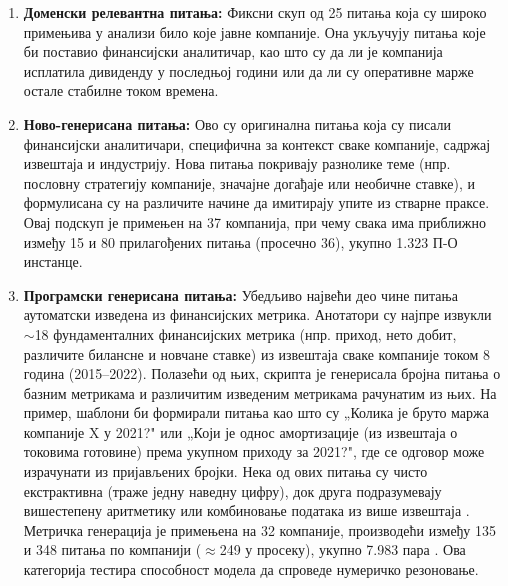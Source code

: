 \begin{enumerate}
\item \textbf{Доменски релевантна питања:} Фиксни скуп од 25 питања која су широко примењива у анализи било које јавне компаније. Она укључују питања које би поставио финансијски аналитичар, као што су да ли је компанија исплатила дивиденду у последњој години или да ли су оперативне марже остале стабилне током времена.

\item \textbf{Ново-генерисана питања:} Ово су оригинална питања која су писали финансијски аналитичари, специфична за контекст сваке компаније, садржај извештаја и индустрију. Нова питања покривају разнолике теме (нпр. пословну стратегију компаније, значајне догађаје или необичне ставке), и формулисана су на различите начине да имитирају упите из стварне праксе. Овај подскуп је примењен на 37 компанија, при чему свака има приближно између 15 и 80 прилагођених питања (просечно 36), укупно 1.323 П-О инстанце.

\item \textbf{Програмски генерисана питања:} Убедљиво највећи део чине питања аутоматски изведена из финансијских метрика. Анотатори су најпре извукли $\sim$18 фундаменталних финансијских метрика (нпр. приход, нето добит, различите билансне и новчане ставке) из извештаја сваке компаније током 8 година (2015–2022). Полазећи од њих, скрипта је генерисала бројна питања о базним метрикама и различитим изведеним метрикама рачунатим из њих. На пример, шаблони би формирали питања као што су „Колика је бруто маржа компаније X у 2021?" или „Који је однос амортизације (из извештаја о токовима готовине) према укупном приходу за 2021?", где се одговор може израчунати из пријављених бројки. Нека од ових питања су чисто екстрактивна (траже једну наведну цифру), док друга подразумевају вишестепену аритметику или комбиновање података из више извештаја \cite{islam_financebench_2023}. Метричка генерација је примењена на 32 компаније, производећи између 135 и 348 питања по компанији ($\approx$249 у просеку), укупно 7.983 пара \cite{islam_financebench_2023}. Ова категорија тестира способност модела да спроведе нумеричко резоновање.
\end{enumerate}
